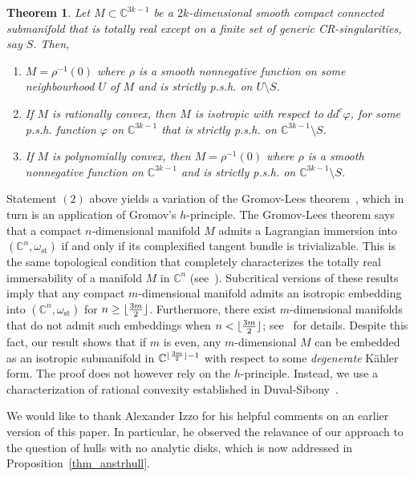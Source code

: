 \documentclass[10pt]{amsart}
\numberwithin{equation}{section}
\theoremstyle{definition}
\theoremstyle{definition}
\theoremstyle{plain}
\newtheorem{theorem}{Theorem}[section]
\DeclarePairedDelimiter\floor{\lfloor}{\rfloor}
\newcommand{\om}{\omega}
\newcommand{\Cn}{\mathbb{C}^n}
\newcommand{\C} {\mathbb{C}}
\newcommand{\std}{_{\operatorname{st}}}
\begin{document}
\begin{theorem}\label{thm_deffn} Let $M\subset\C^{3k-1}$ be a $2k$-dimensional smooth compact connected submanifold that is totally real except on a finite set of generic CR-singularities, say $S$. Then, 
	\begin{enumerate}
\item $M=\rho^{-1}(0)$ where $\rho$ is a smooth nonnegative function on some neighbourhood $U$ of $M$ and is strictly p.s.h. on $U\setminus S$. 
\item If $M$ is rationally convex, then $M$ is isotropic with respect to $dd^c\varphi$, for some p.s.h. function $\varphi$ on $\C^{3k-1}$ that is strictly p.s.h. on $\C^{3k-1}\setminus S$. 
\item If $M$ is polynomially convex, then $M=\rho^{-1}(0)$ where $\rho$ is a smooth nonnegative function on $\C^{3k-1}$ and is strictly p.s.h. on $\C^{3k-1}\setminus S$. 
\end{enumerate}
\end{theorem}

Statement $(2)$ above yields a variation of the Gromov-Lees theorem~\cite{AuLaPo94}, which in turn is an application of
Gromov's $h$-principle. The Gromov-Lees theorem says that a compact $n$-dimensional manifold $M$ admits a 
Lagrangian immersion into $(\Cn,\om\std)$ if and only if its complexified tangent 
bundle is trivializable. This is the same topological condition that completely characterizes the totally real immersability of a manifold 
$M$ in $\Cn$ (see~\cite[Prop. 9.1.4]{Fo11}). Subcritical versions of these results imply that any compact $m$-dimensional manifold
admits an isotropic embedding into $(\Cn,\om\std)$ for $n\ge \floor{\frac{3m}{2}}$. Furthermore, there exist $m$-dimensional 
manifolds that do not admit such embeddings when $n< \floor{\frac{3m}{2}}$; see~\cite{GuSh17} for details. Despite this fact, 
our result shows that if $m$ is even, any $m$-dimensional $M$ can be embedded as an isotropic submanifold in $\C^{\floor{\frac{3m}{2}}-1}$ with respect to some {\it degenerate} K\"ahler form.  The
proof does not however rely on the $h$-principle.  Instead, we use a characterization of rational convexity established in Duval-Sibony~\cite{DuSi95}.

 We would like to thank Alexander Izzo for his helpful comments on an earlier version of this paper. In particular, he observed the relavance of our approach to the question of hulls with no analytic disks, which is now addressed in Proposition~\ref{thm_anstrhull}.
\end{document}
